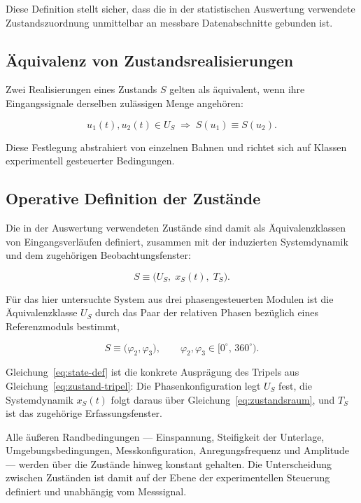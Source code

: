 \documentclass[12pt,a4paper]{report}
\begin{document}
Diese Definition stellt sicher, dass die in der statistischen Auswertung
verwendete Zustandszuordnung unmittelbar an messbare Datenabschnitte
gebunden ist.

\subsection{Äquivalenz von Zustandsrealisierungen}

Zwei Realisierungen eines Zustands $S$ gelten als äquivalent, wenn ihre
Eingangssignale derselben zulässigen Menge angehören:

\begin{equation}
u_1(t), u_2(t) \in U_S \;\Rightarrow\; S(u_1) \equiv S(u_2).
\label{eq:aequivalenz}
\end{equation}

Diese Festlegung abstrahiert von einzelnen Bahnen und richtet sich auf
Klassen experimentell gesteuerter Bedingungen.

\subsection{Operative Definition der Zustände}

Die in der Auswertung verwendeten Zustände sind damit als
Äquivalenzklassen von Eingangsverläufen definiert, zusammen mit der
induzierten Systemdynamik und dem zugehörigen Beobachtungsfenster:

\begin{equation}
S \equiv \bigl(U_S,\; x_S(t),\; T_S\bigr).
\label{eq:zustand-tripel}
\end{equation}

Für das hier untersuchte System aus drei phasengesteuerten Modulen ist
die Äquivalenzklasse $U_S$ durch das Paar der relativen Phasen bezüglich
eines Referenzmoduls bestimmt,

\begin{equation}
  S \equiv \bigl(\varphi_2, \varphi_3\bigr),
  \qquad \varphi_2, \varphi_3 \in [0^\circ,\, 360^\circ).
  \label{eq:state-def}
\end{equation}

Gleichung~\eqref{eq:state-def} ist die konkrete Ausprägung des Tripels
aus Gleichung~\eqref{eq:zustand-tripel}: Die Phasenkonfiguration legt
$U_S$ fest, die Systemdynamik $x_S(t)$ folgt daraus über
Gleichung~\eqref{eq:zustandsraum}, und $T_S$ ist das zugehörige
Erfassungsfenster.

Alle äußeren Randbedingungen --- Einspannung, Steifigkeit der Unterlage,
Umgebungsbedingungen, Messkonfiguration, Anregungsfrequenz und
Amplitude --- werden über die Zustände hinweg konstant gehalten. Die
Unterscheidung zwischen Zuständen ist damit auf der Ebene der
experimentellen Steuerung definiert und unabhängig vom Messsignal.
\end{document}
